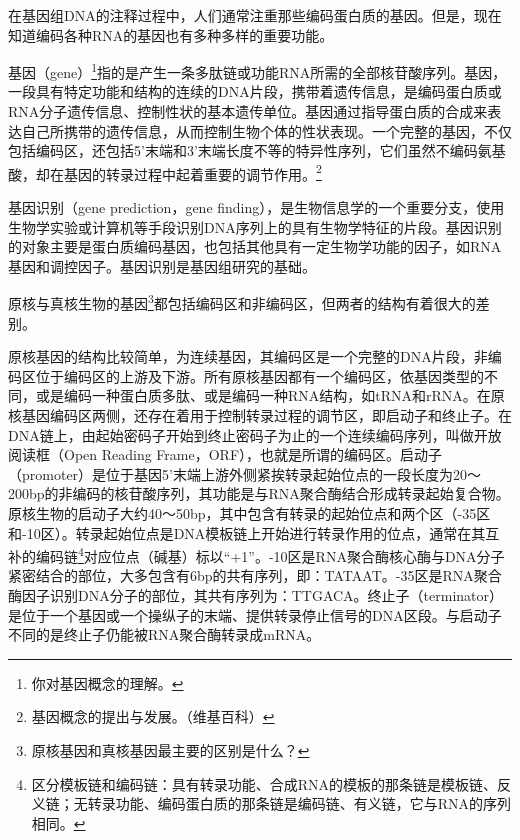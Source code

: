 \documentclass[11pt,a4paper,twoside]{book}
\begin{document}
在基因组DNA的注释过程中，人们通常注重那些编码蛋白质的基因。但是，现在知道编码各种RNA的基因也有多种多样的重要功能。

基因（gene）\footnote{你对基因概念的理解。}指的是产生一条多肽链或功能RNA所需的全部核苷酸序列。基因，一段具有特定功能和结构的连续的DNA片段，携带着遗传信息，是编码蛋白质或RNA分子遗传信息、控制性状的基本遗传单位。基因通过指导蛋白质的合成来表达自己所携带的遗传信息，从而控制生物个体的性状表现。一个完整的基因，不仅包括编码区，还包括5'末端和3'末端长度不等的特异性序列，它们虽然不编码氨基酸，却在基因的转录过程中起着重要的调节作用。\footnote{基因概念的提出与发展。（维基百科）}

\noindent
{}

基因识别（gene prediction，gene finding），是生物信息学的一个重要分支，使用生物学实验或计算机等手段识别DNA序列上的具有生物学特征的片段。基因识别的对象主要是蛋白质编码基因，也包括其他具有一定生物学功能的因子，如RNA基因和调控因子。基因识别是基因组研究的基础。

原核与真核生物的基因\footnote{原核基因和真核基因最主要的区别是什么？}都包括编码区和非编码区，但两者的结构有着很大的差别。

原核基因的结构比较简单，为连续基因，其编码区是一个完整的DNA片段，非编码区位于编码区的上游及下游。所有原核基因都有一个编码区，依基因类型的不同，或是编码一种蛋白质多肽、或是编码一种RNA结构，如tRNA和rRNA。在原核基因编码区两侧，还存在着用于控制转录过程的调节区，即启动子和终止子。在DNA链上，由起始密码子开始到终止密码子为止的一个连续编码序列，叫做开放阅读框（Open Reading Frame，ORF），也就是所谓的编码区。启动子（promoter）是位于基因5'末端上游外侧紧挨转录起始位点的一段长度为20～200bp的非编码的核苷酸序列，其功能是与RNA聚合酶结合形成转录起始复合物。原核生物的启动子大约40～50bp，其中包含有转录的起始位点和两个区（-35区和-10区）。转录起始位点是DNA模板链上开始进行转录作用的位点，通常在其互补的编码链\footnote{区分模板链和编码链：具有转录功能、合成RNA的模板的那条链是模板链、反义链；无转录功能、编码蛋白质的那条链是编码链、有义链，它与RNA的序列相同。}对应位点（碱基）标以“+1”。-10区是RNA聚合酶核心酶与DNA分子紧密结合的部位，大多包含有6bp的共有序列，即：TATAAT。-35区是RNA聚合酶因子识别DNA分子的部位，其共有序列为：TTGACA。终止子（terminator）是位于一个基因或一个操纵子的末端、提供转录停止信号的DNA区段。与启动子不同的是终止子仍能被RNA聚合酶转录成mRNA。
\end{document}
